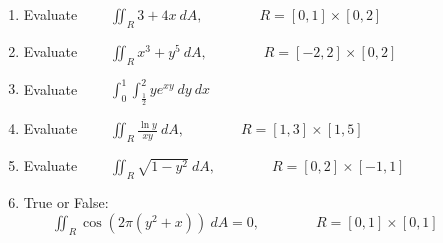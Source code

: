 \begin{enumerate}[{Example} 1: ]

\addtocounter{enumi}{-1}

\item Evaluate \(\qquad \displaystyle \iint_{R} 3+4x \ dA, \qquad \qquad R= [0,1] \times [0,2]\)

\vfill

\item Evaluate \(\qquad \displaystyle \iint_{R} x^3 + y^5 \ dA, \qquad \qquad R= [-2,2] \times [0,2]\)


\vfill

\item Evaluate \(\qquad \displaystyle \int_0^1 \int_{\frac{1}{2}}^2 y e^{xy}\ dy\ dx\)

\vfill

\item Evaluate \(\qquad \displaystyle \iint_{R} \frac{\ln y}{xy} \ dA, \qquad \qquad R= [1,3] \times [1,5]\)

\vfill

\item Evaluate \(\qquad \displaystyle \iint_{R} \sqrt{1-y^2}\ dA, \qquad \qquad R= [0,2] \times [-1,1]\)

\vfill

\item True or False: \(\qquad \displaystyle \iint_{R} \cos\left(2\pi(y^2+x)\right) \ dA=0, \qquad \qquad R= [0,1] \times [0,1]\)


\end{enumerate}



